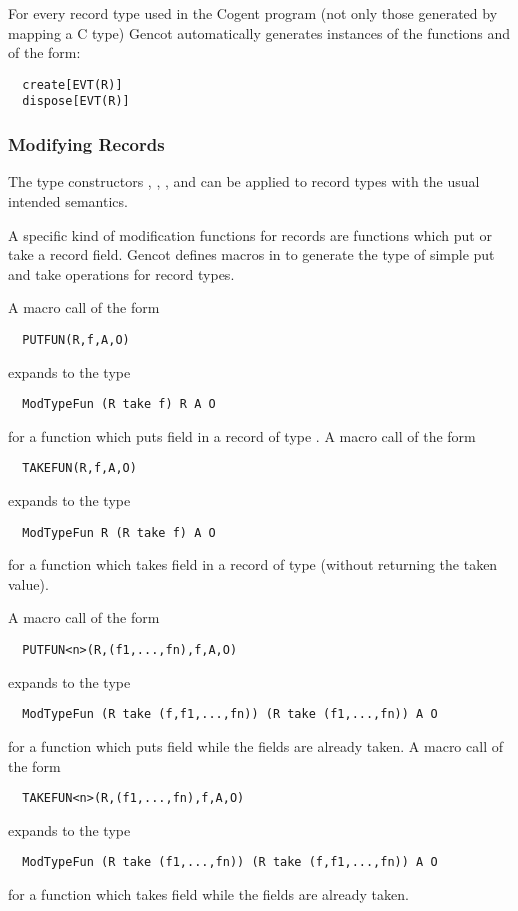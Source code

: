 For every record type  used in the Cogent program (not only those generated by mapping a C type) Gencot automatically
generates instances of the functions  and  of the form:
\begin{verbatim}
  create[EVT(R)]
  dispose[EVT(R)]
\end{verbatim}

\subsubsection{Modifying Records}

The type constructors , , , and  can be applied to record types with the 
usual intended semantics. 

A specific kind of modification functions for records are functions which put or take a record field. 
Gencot defines macros in  to generate the type of simple put and take operations for
record types.

A macro call of the form 
\begin{verbatim}
  PUTFUN(R,f,A,O)
\end{verbatim}
expands to the type
\begin{verbatim}
  ModTypeFun (R take f) R A O
\end{verbatim}
for a function which puts field  in a record of type . A macro call of the form
\begin{verbatim}
  TAKEFUN(R,f,A,O)
\end{verbatim}
expands to the type
\begin{verbatim}
  ModTypeFun R (R take f) A O
\end{verbatim}
for a function which takes field  in a record of type  (without returning the taken value).

A macro call of the form 
\begin{verbatim}
  PUTFUN<n>(R,(f1,...,fn),f,A,O)
\end{verbatim}
expands to the type
\begin{verbatim}
  ModTypeFun (R take (f,f1,...,fn)) (R take (f1,...,fn)) A O
\end{verbatim}
for a function which puts field  while the fields  are already taken. A macro call of the form
\begin{verbatim}
  TAKEFUN<n>(R,(f1,...,fn),f,A,O)
\end{verbatim}
expands to the type
\begin{verbatim}
  ModTypeFun (R take (f1,...,fn)) (R take (f,f1,...,fn)) A O
\end{verbatim}
for a function which takes field  while the fields  are already taken.

